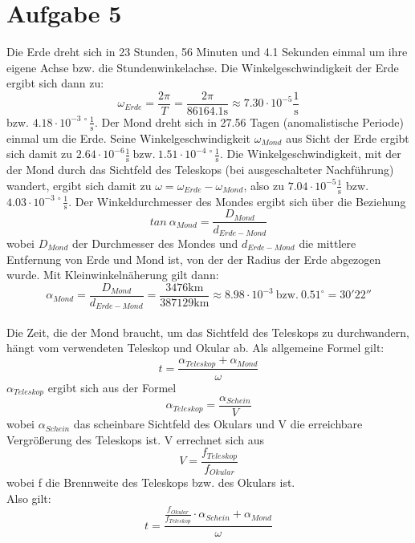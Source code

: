 \section{Aufgabe 5}
Die Erde dreht sich in 23 Stunden, 56 Minuten und 4.1 Sekunden einmal um ihre eigene Achse bzw. die Stundenwinkelachse.
Die Winkelgeschwindigkeit der Erde ergibt sich dann zu:
\begin{equation}
\omega_{Erde} = \frac{2\pi}{T} = \frac{2\pi}{86164.1 \mathrm{s}} \approx 7.30 \cdot 10^{-5} \frac{1}{\mathrm{s}}
\end{equation}
bzw. $4.18 \cdot 10^{-3\   \circ} \frac{1}{\mathrm{s}}$.
Der Mond dreht sich in 27.56 Tagen (anomalistische Periode) einmal um die Erde. Seine Winkelgeschwindigkeit $\omega_{Mond}$ aus Sicht der Erde ergibt sich damit zu $2.64\cdot 10^{-6} \frac{1}{\mathrm{s}}\ \textrm{bzw.}\ 1.51 \cdot 10^{-4\   \circ} \frac{1}{\mathrm{s}}$.
Die Winkelgeschwindigkeit, mit der der Mond durch das Sichtfeld des Teleskops (bei ausgeschalteter Nachführung) wandert, ergibt sich damit zu $\omega = \omega_{Erde}-\omega_{Mond}$, also zu $7.04\cdot 10^{-5} \frac{1}{\mathrm{s}}$ bzw. $4.03 \cdot 10^{-3\   \circ} \frac{1}{\mathrm{s}}$. 
Der Winkeldurchmesser des Mondes ergibt sich über die Beziehung
\begin{equation}
tan\  \alpha_{Mond} = \frac{D_{Mond}}{d_{Erde-Mond}}
\end{equation}
wobei $D_{Mond}$ der Durchmesser des Mondes und $d_{Erde-Mond}$ die mittlere Entfernung von Erde und Mond ist, von der der Radius der Erde abgezogen wurde.
Mit Kleinwinkelnäherung gilt dann:
\begin{equation}
\alpha_{Mond} = \frac{D_{Mond}}{d_{Erde-Mond}} = \frac{3476 \mathrm{km}}{387129 \mathrm{km}} \approx 8.98 \cdot 10^{-3}\ \mathrm{bzw.}\ 0.51^{\circ} = 30' 22''
\end{equation}
\\
Die Zeit, die der Mond braucht, um das Sichtfeld des Teleskops zu durchwandern, hängt vom verwendeten Teleskop und Okular ab.
Als allgemeine Formel gilt:
\begin{equation}
t = \frac{\alpha_{Teleskop}+\alpha_{Mond}}{\omega}
\end{equation}
$\alpha_{Teleskop}$ ergibt sich aus der Formel
\begin{equation}
\alpha_{Teleskop} = \frac{\alpha_{Schein}}{V}
\end{equation}
wobei $\alpha_{Schein}$ das scheinbare Sichtfeld des Okulars und V die erreichbare Vergrößerung des Teleskops ist. V errechnet sich aus
\begin{equation}
V = \frac{f_{Teleskop}}{f_{Okular}}
\end{equation}
wobei f die Brennweite des Teleskops bzw. des Okulars ist.
\\
Also gilt:
\begin{equation}
t = \frac{\frac{f_{Okular}}{f_{Teleskop}}\cdot \alpha_{Schein} + \alpha_{Mond}}{\omega}
\end{equation}